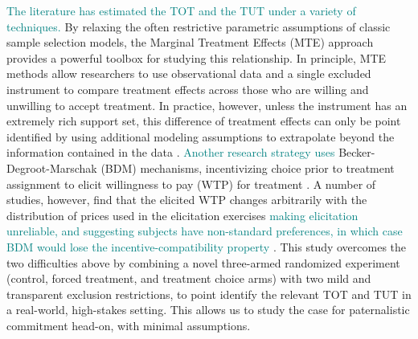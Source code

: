 \documentclass[oneside,11pt]{article}
\begin{document}
\textcolor{teal}{The literature has estimated the TOT and the TUT under a variety of techniques.}
By relaxing the often restrictive parametric assumptions of classic sample selection models, the Marginal Treatment Effects (MTE) approach \citep{heckman2007econometric} provides a powerful toolbox for studying this relationship. In principle, MTE methods allow researchers to use observational data and a single excluded instrument to compare treatment effects across those who are willing and unwilling to accept treatment. In practice, however, unless the instrument has an extremely rich support set, this difference of treatment effects can only be point identified by using additional modeling assumptions to extrapolate beyond the information contained in the data \citep{mogstad2018using}. \textcolor{teal}{Another research strategy uses} Becker-Degroot-Marschak (BDM) mechanisms, incentivizing choice prior to treatment assignment to elicit willingness to pay (WTP) for treatment \citep{becker1964measuring}. %
A number of studies, however, find that the elicited WTP changes arbitrarily with the distribution of prices used in the elicitation exercises \citep{bohm1997eliciting,banerji2014detection} %
\textcolor{teal}{making elicitation unreliable, and suggesting subjects have non-standard preferences, in which case BDM would lose the incentive-compatibility property} %
\citep{mamadehussene2023reliability}. %
This study overcomes the two difficulties above by combining a novel three-armed randomized experiment (control, forced treatment, and treatment choice arms) with two mild and transparent exclusion restrictions, to point identify the relevant TOT and TUT in a real-world, high-stakes setting. This allows us to study the case for paternalistic commitment head-on, with minimal assumptions.
\end{document}
